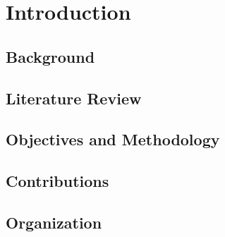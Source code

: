 \chapter{Introduction} \label{cha:introduction}

\section{Background}\label{sec:background}
  

\section{Literature Review}\label{sec:literature-review}
  

\section{Objectives and Methodology}\label{sec:objectives-and-methodology}
  

\section{Contributions}\label{sec:contributions}
  

\section{Organization}\label{sec:organization}
  